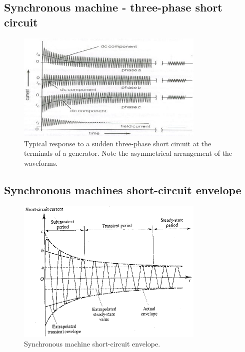 \subsection{Synchronous machine - three-phase short circuit}
\begin{figure}[H]
    \centering
    \includegraphics[width = 0.8\textwidth]{img/figure87.png}
    \caption{Typical response to a sudden three-phase short circuit at the terminals of a generator. Note the asymmetrical arrangement of the waveforms.}
\end{figure}
\subsection{Synchronous machines short-circuit envelope}
\begin{figure}[H]
    \centering
    \includegraphics[width = 0.8\textwidth]{img/figure88.png}
    \caption{Synchronous machine short-circuit envelope.}
\end{figure}
